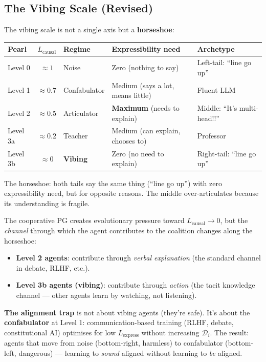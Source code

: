 \documentclass[11pt,a4paper]{article}
\begin{document}
\subsection{The Vibing Scale (Revised)}

The vibing scale is not a single axis but a \textbf{horseshoe}:

\begin{center}
\begin{tabular}{lclll}
\toprule
\textbf{Pearl} & $L_{\text{causal}}$ & \textbf{Regime} & \textbf{Expressibility need} & \textbf{Archetype} \\
\midrule
Level 0 & $\approx 1$ & Noise &
    Zero (nothing to say) & Left-tail: ``line go up'' \\
Level 1 & $\approx 0.7$ & Confabulator &
    Medium (says a lot, means little) & Fluent LLM \\
Level 2 & $\approx 0.5$ & Articulator &
    \textbf{Maximum} (needs to explain) & Middle: ``It's multi-head!!'' \\
Level 3a & $\approx 0.2$ & Teacher &
    Medium (can explain, chooses to) & Professor \\
Level 3b & $\approx 0$ & \textbf{Vibing} &
    Zero (no need to explain) & Right-tail: ``line go up'' \\
\bottomrule
\end{tabular}
\end{center}

The horseshoe: both tails say the same thing (``line go up'') with
zero expressibility need, but for opposite reasons. The middle
over-articulates because its understanding is fragile.

The cooperative PG creates evolutionary pressure toward
$L_{\text{causal}} \to 0$, but the \emph{channel} through which
the agent contributes to the coalition changes along the horseshoe:

\begin{itemize}
    \item \textbf{Level 2 agents}: contribute through \emph{verbal
    explanation} (the standard channel in debate, RLHF, etc.).
    \item \textbf{Level 3b agents (vibing)}: contribute through
    \emph{action} (the tacit knowledge channel --- other agents
    learn by watching, not listening).
\end{itemize}

\textbf{The alignment trap} is not about vibing agents (they're safe).
It's about the \textbf{confabulator} at Level 1: communication-based
training (RLHF, debate, constitutional AI) optimises for low
$L_{\text{express}}$ without increasing $\mathcal{D}_i$. The result:
agents that move from noise (bottom-right, harmless) to confabulator
(bottom-left, dangerous) --- learning to \emph{sound} aligned without
learning to \emph{be} aligned.
\end{document}

